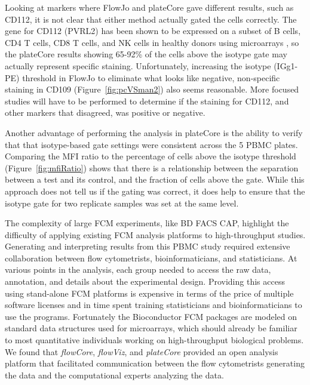\documentclass[12pt]{article}
\newcommand{\Rpackage}[1]{{\textit{#1}}}
\begin{document}
Looking at markers where FlowJo and plateCore gave different results, such as
CD112, it is not clear that either method actually gated the cells correctly.
The gene for CD112 (PVRL2) has been shown to be expressed on a subset of B cells,
CD4 T cells, CD8 T cells, and NK cells in healthy donors using microarrays
\citep{Critchley2007}, so the plateCore results showing 65-92\% of the cells
above the isotype gate may actually represent specific staining. Unfortunately,
increasing the isotype (IGg1-PE) threshold in FlowJo to eliminate what looks
like negative, non-specific staining in CD109 (Figure~\ref{fig:pcVSman2}) also
seems reasonable. More focused studies will have to be performed to determine
if the staining for CD112, and other markers that disagreed, was positive or
negative.

Another advantage of performing the analysis in plateCore is the ability to
verify that that isotype-based gate settings were consistent across the 5
PBMC plates. Comparing the MFI ratio to the percentage of cells above the
isotype threshold (Figure~\ref{fig:mfiRatio}) shows that there is a
relationship between the separation between a test and its control, and the
fraction of cells above the gate. While this approach does not tell us if the
gating was correct, it does help to ensure that the isotype gate for two
replicate samples was set at the same level. 

The complexity of large FCM experiments, like BD FACS CAP, highlight the 
difficulty of applying existing FCM analysis platforms to high-throughput
studies. Generating and interpreting results from this PBMC study required
extensive collaboration between flow cytometrists, bioinformaticians, and
statisticians. At various points in the analysis, each group needed to access
the raw data, annotation, and details about the experimental design. Providing
this access using stand-alone FCM platforms is expensive in terms of the price
of multiple software licenses and in time spent training statisticians and
bioinformaticians to use the programs. Fortunately the Bioconductor FCM
packages are modeled on standard data structures used for microarrays, which
should already be familiar to most quantitative individuals working on
high-throughput biological problems. We found that \Rpackage{flowCore},
\Rpackage{flowViz}, and \Rpackage{plateCore} provided an open analysis platform
that facilitated communication between the flow cytometrists generating the
data and the computational experts analyzing the data.


\end{document}
